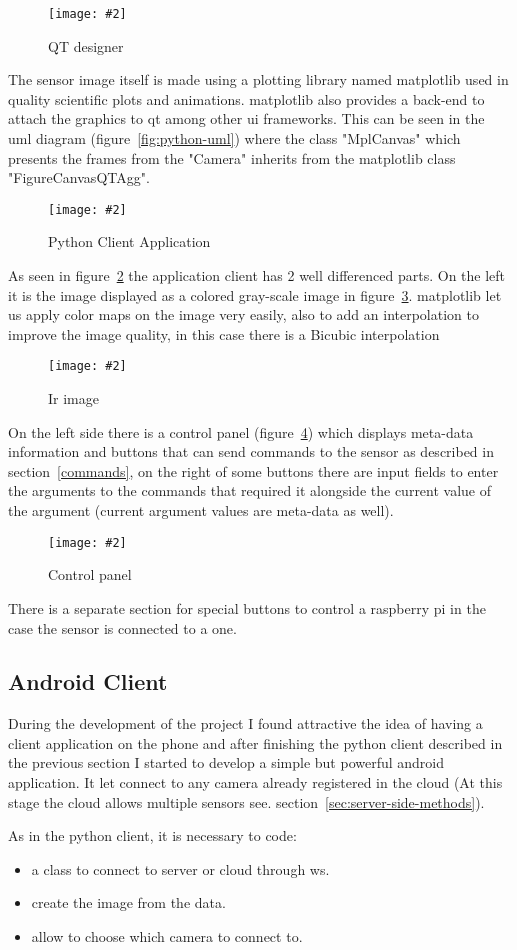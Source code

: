\documentclass[hidelinks,11pt,a4paper,oneside,article]{memoir}
\newcommand{\putimage}[3][10] %
{
\begin{figure}[h]
	\centering
	\captionsetup{justification=centering}
	\texttt{[image: \#2]}
	\caption{#3}
	\label{fig:#2}
\end{figure}
}
\begin{document}
    \putimage{qt-designer}{QT designer}

The sensor image itself is made using a plotting library named \gls{matplotlib} used in quality scientific plots and animations. \gls{matplotlib}  also provides a back-end to attach the graphics to \gls{qt} among other \gls{ui} frameworks. This can be seen in the \gls{uml} diagram (figure~\ref{fig:python-uml}) where the class "MplCanvas" which presents the frames from the "Camera" inherits from the \gls{matplotlib} class "FigureCanvasQTAgg". %

    \putimage{python-client}{Python Client Application}
    
As seen in figure~\ref{fig:python-client} the application client has 2 well differenced parts. On the left it is the image displayed as a colored gray-scale image in figure~\ref{fig:ir-image}. \gls{matplotlib} let us apply color maps on the image very easily, also to add an interpolation to improve the image quality, in this case there is a Bicubic interpolation %

    \putimage[5]{ir-image}{Ir image}

On the left side there is a control panel (figure~\ref{fig:control-panel}) which displays meta-data information and buttons that can send commands to the sensor as described in section~\ref{commands}, on the right of some buttons there are input fields to enter the arguments to the commands that required it alongside the current value of the argument (current argument values are meta-data as well).

    \putimage{control-panel}{Control panel}
    
There is a separate section for special buttons to control a raspberry pi in the case the sensor is connected to a one.


\subsection{Android Client}
During the development of the project I found attractive the idea of having a client application on the phone and after finishing the python client described in the previous section I started to develop a simple but powerful \gls{android} application. It let connect to any camera already registered in the cloud (At this stage the cloud allows multiple sensors see. section~\ref{sec:server-side-methods}).

As in the python client, it is necessary to code:
\begin{itemize}
    \item a class to connect to server or cloud through \gls{ws}.
    \item create the image from the data.
    \item allow to choose which camera to connect to.
\end{itemize}
\end{document}
